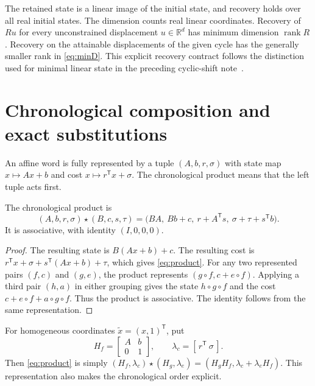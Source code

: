 \documentclass[11pt,a4paper]{article}
\theoremstyle{definition}\newtheorem{definition}[theorem]{Definition}\newtheorem{example}[theorem]{Example}\newtheorem{remark}[theorem]{Remark}
\DeclareMathOperator{\rank}{rank}\DeclareMathOperator{\im}{im}\DeclareMathOperator{\spanop}{span}\DeclareMathOperator{\diag}{diag}
\newcommand{\R}{\mathbb R}\newcommand{\Q}{\mathbb Q}\newcommand{\Z}{\mathbb Z}\newcommand{\N}{\mathbb N}\newcommand{\id}{\mathrm{id}}
\begin{document}
The retained state is a linear image of the initial state, and recovery
holds over all real initial states. The dimension counts real linear
coordinates. Recovery of $Ru$
for every unconstrained displacement $u\in\R^d$ has minimum
dimension $\rank R$. Recovery on the attainable displacements of
the given cycle has the generally smaller rank in \eqref{eq:minD}.
This explicit recovery contract follows the distinction used for
minimal linear state in the preceding cyclic-shift note~\cite{cyclic}.

\section{Chronological composition and exact substitutions}
An affine word is fully represented by a tuple
$(A,b,r,\sigma)$ with state map $x\mapsto Ax+b$ and cost
$x\mapsto r^{\mathsf T}x+\sigma$.
The chronological product means that the left tuple acts first.

\begin{proposition}\label{prop:compose}
The chronological product is
\begin{equation}\label{eq:product}
 (A,b,r,\sigma)\star(B,c,s,\tau)
 =\bigl(BA,\ Bb+c,\ r+A^{\mathsf T}s,\
             \sigma+\tau+s^{\mathsf T}b\bigr).
\end{equation}
It is associative, with identity $(I,0,0,0)$.
\end{proposition}
\begin{proof}
The resulting state is $B(Ax+b)+c$. The resulting cost is
$r^{\mathsf T}x+\sigma+s^{\mathsf T}(Ax+b)+\tau$, which gives
\eqref{eq:product}. For any two represented pairs $(f,c)$ and $(g,e)$,
the product represents $(g\circ f,c+e\circ f)$. Applying a third pair
$(h,a)$ in either grouping gives the state $h\circ g\circ f$ and the
cost $c+e\circ f+a\circ g\circ f$. Thus the product is associative.
The identity follows from the same representation.
\end{proof}

For homogeneous coordinates $\widetilde x=(x,1)^{\mathsf T}$, put
\[
 H_f=\begin{bmatrix}A&b\\0&1\end{bmatrix},
 \qquad \lambda_c=[\,r^{\mathsf T}\ \sigma\,].
\]
Then \eqref{eq:product} is simply
$(H_f,\lambda_c)\star(H_g,\lambda_e)
=(H_gH_f,\lambda_c+\lambda_eH_f)$.
This representation also makes the chronological order explicit.
\end{document}
